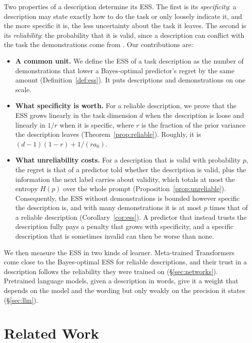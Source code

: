 \documentclass[10pt]{article}
\begin{document}
Two properties of a description determine its ESS. The first is its \emph{specificity}: a description may state exactly how to do the task or only loosely indicate it, and the more specific it is, the less uncertainty about the task it leaves. The second is its \emph{reliability}: the probability that it is valid, since a description can conflict with the task the demonstrations come from \citep{evans2006}. Our contributions are:
\begin{itemize}
    \item \textbf{A common unit.} We define the ESS of a task description as the number of demonstrations that lower a Bayes-optimal predictor's regret by the same amount (Definition~\ref{def:ess}). It puts descriptions and demonstrations on one scale.
    \item \textbf{What specificity is worth.} For a reliable description, we prove that the ESS grows linearly in the task dimension $d$ when the description is loose and linearly in $1/r$ when it is specific, where $r$ is the fraction of the prior variance the description leaves (Theorem~\ref{prop:reliable}). Roughly, it is $(d-1)(1-r) + 1/(r a_0)$.
    \item \textbf{What unreliability costs.} For a description that is valid with probability $p$, the regret is that of a predictor told whether the description is valid, plus the information the next label carries about validity, which totals at most the entropy $H(p)$ over the whole prompt (Proposition~\ref{prop:unreliable}). Consequently, the ESS without demonstrations is bounded however specific the description is, and with many demonstrations it is at most $p$ times that of a reliable description (Corollary~\ref{cor:ess}). A predictor that instead trusts the description fully pays a penalty that grows with specificity, and a specific description that is sometimes invalid can then be worse than none.
\end{itemize}
We then measure the ESS in two kinds of learner. Meta-trained Transformers come close to the Bayes-optimal ESS for reliable descriptions, and their trust in a description follows the reliability they were trained on (\S\ref{sec:networks}). Pretrained language models, given a description in words, give it a weight that depends on the model and the wording but only weakly on the precision it states (\S\ref{sec:llm}).

\section{Related Work}
\end{document}
